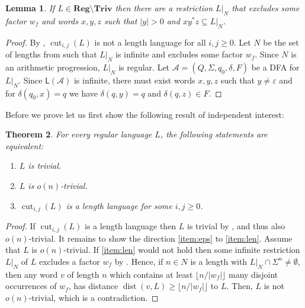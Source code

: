 \documentclass{article}\usepackage[a4paper,margin=20mm]{geometry}
\newtheorem{theorem}{Theorem}\newtheorem{lemma}[theorem]{Lemma}\newtheorem{proposition}[theorem]{Proposition}\newtheorem{corollary}[theorem]{Corollary}\newtheorem{definition}[theorem]{Definition}\newtheorem{claim}[theorem]{Claim}\newtheorem{remark}[theorem]{Remark}\newtheorem{observation}[theorem]{Observation}\newtheorem{conjecture}[theorem]{Conjecture}\newtheorem{example}[theorem]{Example}
\newcommand{\A}{\mathcal{A}}
\renewcommand{\L}{\mathsf{L}}
\DeclareMathOperator{\dist}{dist}
\DeclareMathOperator{\cut}{cut}
\newcommand{\Reg}{\mathbf{Reg}}
\newcommand{\Triv}{\mathbf{Triv}}
\renewcommand{\geq}{\geqslant}
\renewcommand{\ge}{\geq}
\begin{document}
\begin{lemma} \label{lemma-reg-nontriv}
If $L \in \Reg \setminus \Triv$ then there 
are a restriction $L|_N$ that excludes some factor $w_f$ and words $x,y,z$ such that $|y|>0$ and 
$x y^* z \subseteq L|_N$.
\end{lemma}

\begin{proof}
By , $\cut_{i,j}(L)$ is not a length language for all $i, j \ge 0$.
Let $N$ be the set of lengths from 
such that $L|_N$ is infinite and excludes some factor $w_f$. 
Since $N$ is an arithmetic progression, $L|_N$ is regular. 
Let $\A = (Q,\Sigma,q_0,\delta,F)$ be a DFA for $L|_N$.
Since $\L(\A)$ is infinite, there must exist words $x,y,z$ such that $y \neq \varepsilon$ and 
for $\delta(q_0,x) = q$ we have $\delta(q, y) = q$ and $\delta(q,z) \in F$.
\end{proof}
Before we prove  let us first show the following result of independent interest:

\begin{theorem} 
	\label{triv-alon}
	For every regular language $L$, the following statements are equivalent:
	\begin{enumerate}[label=(\roman{*}), ref=(\roman{*})]
		\item $L$ is trivial.
		\item $L$ is $o(n)$-trivial. \label{item:eps}
		\item $\cut_{i,j}(L)$ is a length language for some $i, j \ge 0$. \label{item:len}
	\end{enumerate}
\end{theorem}


\begin{proof}
	If $\cut_{i,j}(L)$ is a length language then $L$ is trivial by ,
	and thus also $o(n)$-trivial. 
	It remains to show the direction \ref{item:eps} to \ref{item:len}.
	Assume that $L$ is $o(n)$-trivial.
	If \ref{item:len} would not hold then
	some infinite restriction $L|_N$ of $L$ excludes a factor $w_f$ by .
	Hence, if $n \in N$ is a length with $L|_N \cap \Sigma^n \neq \emptyset$,
	then any word $v$ of length $n$
	which contains at least $\lfloor n/|w_f| \rfloor$
	many disjoint occurrences of $w_f$, has distance $\dist(v,L) \ge \lfloor n/|w_f| \rfloor$ to $L$.
	Then, $L$ is not $o(n)$-trivial, which is a contradiction.
\end{proof}
\end{document}
